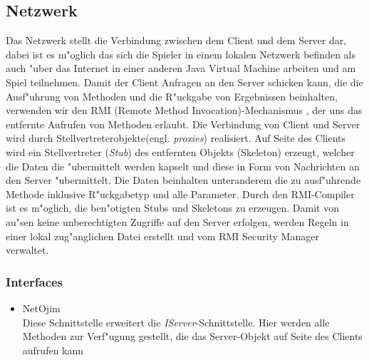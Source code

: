 \documentclass[a4paper,10pt]{article}
\begin{document}
\subsection{Netzwerk}
Das Netzwerk stellt die Verbindung zwischen dem Client und dem Server dar, dabei ist es m"oglich das sich die Spieler in einem lokalen
Netzwerk befinden als auch "uber das Internet in einer anderen Java Virtual Machine arbeiten und am Spiel teilnehmen. Damit der Client Anfragen an den Server schicken kann, die die Ausf"uhrung von Methoden und die R"uckgabe von Ergebnissen beinhalten, verwenden wir den RMI (Remote Method Invocation)-Mechanismus , der uns das entfernte Aufrufen von Methoden erlaubt. Die Verbindung von Client und Server wird durch Stellvertreterobjekte(engl. \textit{proxies}) realisiert. Auf Seite des Clients wird ein Stellvertreter (\textit{Stub}) des entfernten Objekts (Skeleton) erzeugt, welcher die Daten die "ubermittelt werden kapselt und diese in Form von Nachrichten an den Server "ubermittelt. Die Daten beinhalten unteranderem die zu ausf"uhrende Methode inklusive R"uckgabetyp und alle Parameter. Durch den RMI-Compiler ist es m"oglich, die ben"otigten Stubs und Skeletons zu erzeugen. Damit von au"sen keine unberechtigten Zugriffe auf den Server erfolgen, werden Regeln in einer lokal zug"anglichen Datei erstellt und vom RMI Security Manager verwaltet.    
  
\subsubsection{Interfaces}
\begin{itemize}
\item NetOjim \\
Diese Schnittstelle erweitert die \textit{IServer}-Schnittstelle. Hier werden alle Methoden zur Verf"ugung gestellt, die das Server-Objekt auf Seite des Clients aufrufen kann
\end{itemize}
\end{document}
